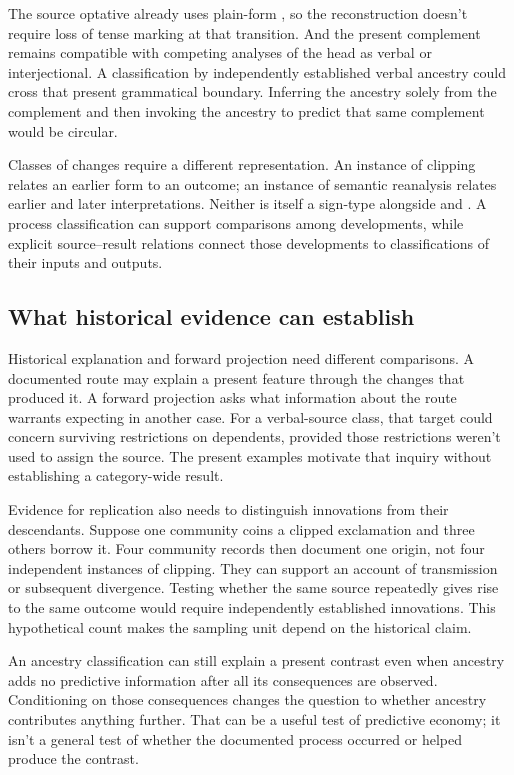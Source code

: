 \documentclass[12pt]{article}
\begin{document}
The source optative already uses plain-form , so the
reconstruction doesn't require loss of tense marking at that transition.
And the present complement remains compatible with competing analyses
of the head as verbal or interjectional. A classification by independently
established verbal ancestry could cross that present grammatical boundary.
Inferring the ancestry solely from the complement and then invoking
the ancestry to predict that same complement would be circular.

Classes of changes require a different representation. An instance of
clipping relates an earlier form to an outcome; an instance of semantic
reanalysis relates earlier and later interpretations. Neither is itself
a sign-type alongside  and . A process
classification can support comparisons among developments, while explicit
source--result relations connect those developments to classifications
of their inputs and outputs.

\subsection{What historical evidence can establish}

Historical explanation and forward projection need different comparisons.
A documented route may explain a present feature through the changes
that produced it. A forward projection asks what information about the
route warrants expecting in another case. For a verbal-source class,
that target could concern surviving restrictions on dependents, provided
those restrictions weren't used to assign the source. The present
examples motivate that inquiry without establishing a category-wide result.

Evidence for replication also needs to distinguish innovations from their
descendants. Suppose one community coins a clipped exclamation and
three others borrow it. Four community records then document one
origin, not four independent instances of clipping. They can support
an account of transmission or subsequent divergence. Testing whether
the same source repeatedly gives rise to the same outcome would
require independently established innovations. This hypothetical count
makes the sampling unit depend on the historical claim.

An ancestry classification can still explain a present contrast even
when ancestry adds no predictive information after all its consequences
are observed. Conditioning on those consequences changes the question
to whether ancestry contributes anything further. That can be a useful
test of predictive economy; it isn't a general test of whether the
documented process occurred or helped produce the contrast.
\end{document}

